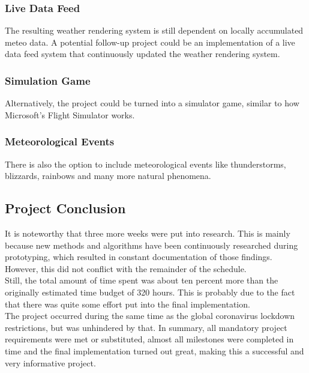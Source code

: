 \subsubsection{Live Data Feed}
The resulting weather rendering system is still dependent on locally accumulated meteo data. 
A potential follow-up project could be an implementation of a live data feed system that continuously updated the weather rendering system.

\subsubsection{Simulation Game}
Alternatively, the project could be turned into a simulator game, similar to how Microsoft's Flight Simulator works.

\subsubsection{Meteorological Events}
There is also the option to include meteorological events like thunderstorms, blizzards, rainbows and many more natural phenomena.

\subsection{Project Conclusion}
\label{section:project:conclusion}
It is noteworthy that three more weeks were put into research.
This is mainly because new methods and algorithms have been continuously researched during prototyping, which resulted in constant documentation of those findings.
However, this did not conflict with the remainder of the schedule.
\\
Still, the total amount of time spent was about ten percent more than the originally estimated time budget of 320 hours.
This is probably due to the fact that there was quite some effort put into the final implementation.
\\
The project occurred during the same time as the global coronavirus lockdown restrictions, but was unhindered by that.
\emptyline
In summary, all mandatory project requirements were met or substituted, almost all milestones were completed in time and the final implementation turned out great, making this a successful and very informative project.